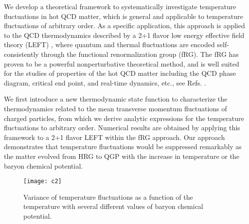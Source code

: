 \documentclass[aps,twocolumn,prd,superscriptaddress,nofootinbib,floatfix]{revtex4-2}
\begin{document}
We develop a theoretical framework to systematically investigate temperature fluctuations in hot QCD matter, which is general and applicable to temperature fluctuations of arbitrary order. As a specific application, this approach is applied to the QCD thermodynamics described by a 2+1 flavor low energy effective field theory (LEFT) \cite{Wen:2018nkn}, where quantum and thermal fluctuations are encoded self-consistently through the functional renormalization group (fRG). The fRG has proven to be a powerful nonperturbative theoretical method, and is well suited for the studies of properties of the hot QCD matter including the QCD phase diagram, critical end point, and real-time dynamics, etc., see Refs. \cite{Fu:2019hdw, Braun:2020ada, Braun:2023qak, Tan:2024fuq, Fu:2024rto, Dupuis:2020fhh, Fu:2022gou}.

We first introduce a new thermodynamic state function to characterize the thermodynamics related to the mean transverse momentum fluctuations of charged particles, from which we derive analytic expressions for the temperature fluctuations to arbitrary order. Numerical results are obtained by applying this framework to a 2+1 flavor LEFT within the fRG approach. Our approach demonstrates that temperature fluctuations would be suppressed remarkably as the matter evolved from HRG to QGP with the increase in temperature or the baryon chemical potential. 


%
\begin{figure}[t]
\texttt{[image: c2]}
\caption{Variance of temperature fluctuations as a function of the temperature with several different values of baryon chemical potential.}
\label{fig:c2}
\end{figure}
%
\end{document}

